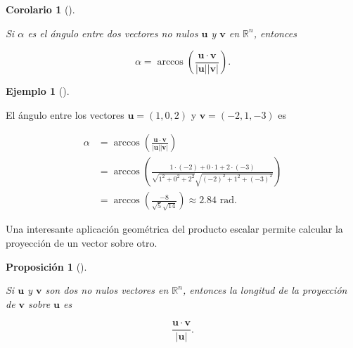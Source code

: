 \documentclass[
  a4paper,
]{scrreport}
\theoremstyle{definition}
\newtheorem{example}{Ejemplo}[chapter]
\theoremstyle{plain}
\newtheorem{corollary}{Corolario}[chapter]
\theoremstyle{definition}
\theoremstyle{definition}
\theoremstyle{plain}
\theoremstyle{plain}
\newtheorem{proposition}{Proposición}[chapter]
\theoremstyle{remark}
\begin{document}
\begin{corollary}[]\protect\hypertarget{cor-producto-escalar}{}\label{cor-producto-escalar}

Si \(\alpha\) es el ángulo entre dos vectores no nulos \(\mathbf{u}\) y
\(\mathbf{v}\) en \(\mathbb{R}^n\), entonces

\[
\alpha = \operatorname{arccos}\left(\frac{\mathbf{u}\cdot \mathbf{v}}{|\mathbf{u}||\mathbf{v}|}\right).
\]

\end{corollary}

\begin{example}[]\protect\hypertarget{exm-angulo-entre-vectores}{}\label{exm-angulo-entre-vectores}

El ángulo entre los vectores \(\mathbf{u}=(1,0,2)\) y
\(\mathbf{v}=(-2,1,-3)\) es

\begin{align*}
\alpha 
&= \operatorname{arccos}\left(\frac{\mathbf{u}\cdot \mathbf{v}}{|\mathbf{u}||\mathbf{v}|}\right) \\
&= \operatorname{arccos}\left(\frac{1\cdot(-2)+0\cdot 1+2\cdot (-3)}{\sqrt{1^2+0^2+2^2}\sqrt{(-2)^2+1^2+(-3)^2}}\right)\\
& = \operatorname{arccos}\left(\frac{-8}{\sqrt{5}\sqrt{14}} \right) \approx 2.84 \mbox{ rad}.
\end{align*}

\end{example}

Una interesante aplicación geométrica del producto escalar permite
calcular la proyección de un vector sobre otro.

\begin{proposition}[]\protect\hypertarget{prp-proyeccion-producto-escalar}{}\label{prp-proyeccion-producto-escalar}

Si \(\mathbf{u}\) y \(\mathbf{v}\) son dos no nulos vectores en
\(\mathbb{R}^n\), entonces la longitud de la proyección de
\(\mathbf{v}\) sobre \(\mathbf{u}\) es

\[
\frac{\mathbf{u}\cdot \mathbf{v}}{|\mathbf{u}|}.
\]

\end{proposition}
\end{document}
